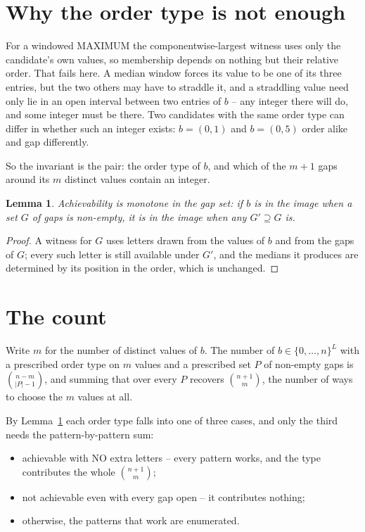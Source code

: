 \documentclass[11pt,a4paper]{article}
\theoremstyle{plain}
\newtheorem{lemma}[theorem]{Lemma}
\theoremstyle{definition}
\begin{document}
\section{Why the order type is not enough}

For a windowed MAXIMUM the componentwise-largest witness uses only the candidate's own values,
so membership depends on nothing but their relative order. That fails here. A median window
forces its value to be one of its three entries, but the two others may have to straddle it, and
a straddling value need only lie in an open interval between two entries of $b$ -- any integer
there will do, and some integer must be there. Two candidates with the same order type can differ
in whether such an integer exists: $b=(0,1)$ and $b=(0,5)$ order alike and gap differently.

So the invariant is the pair: the order type of $b$, and which of the $m+1$ gaps around its $m$
distinct values contain an integer.

\begin{lemma}\label{lem:mono}
Achievability is monotone in the gap set: if $b$ is in the image when a set $G$ of gaps is
non-empty, it is in the image when any $G'\supseteq G$ is.
\end{lemma}

\begin{proof}
A witness for $G$ uses letters drawn from the values of $b$ and from the gaps of $G$; every such
letter is still available under $G'$, and the medians it produces are determined by its position
in the order, which is unchanged.
\end{proof}

\section{The count}

Write $m$ for the number of distinct values of $b$. The number of $b\in\{0,\dots,n\}^{L}$ with
a prescribed order type on $m$ values and a prescribed set $P$ of non-empty gaps is
$\binom{n-m}{\lvert P\rvert-1}$, and summing that over every $P$ recovers
$\binom{n+1}{m}$, the number of ways to choose the $m$ values at all.

By Lemma~\ref{lem:mono} each order type falls into one of three cases, and only the third needs
the pattern-by-pattern sum:

\begin{itemize}
\item achievable with NO extra letters -- every pattern works, and the type contributes the whole
      $\binom{n+1}{m}$;
\item not achievable even with every gap open -- it contributes nothing;
\item otherwise, the patterns that work are enumerated.
\end{itemize}
\end{document}
